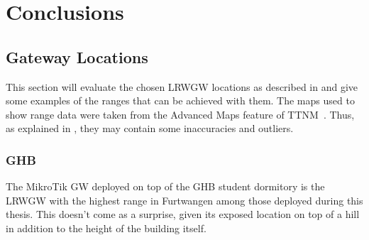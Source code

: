 \chapter{Conclusions}

\section{Gateway Locations}\label{sec:gateway-locations-conclusions}

This section will evaluate the chosen \acl{LRWGW} locations as described in  and give some examples of the ranges that can be achieved with them.
The maps used to show range data were taken from the Advanced Maps feature of \ac{TTNM}~\cite{ttn_mapper_ttn_2023-1}.
Thus, as explained in , they may contain some inaccuracies and outliers.

\subsection{\acl{GHB}}\label{subsec:ghb-student-dormitory-range-results}

The MikroTik \acl{GW} deployed on top of the \ac{GHB} student dormitory is the \acl{LRWGW} with the highest range in Furtwangen among those deployed during this thesis.
This doesn't come as a surprise, given its exposed location on top of a hill in addition to the height of the building itself.

